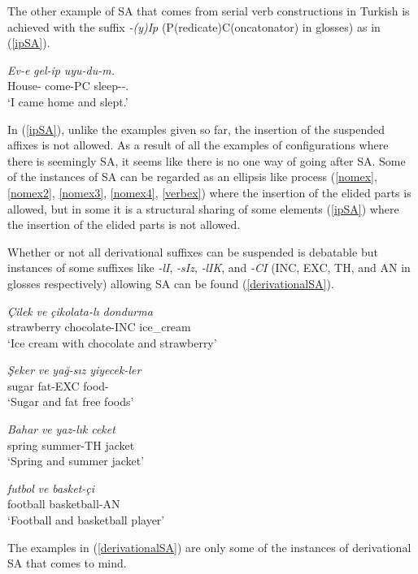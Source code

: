 The other example of SA that comes from serial verb constructions in Turkish is achieved with the suffix \textit{-(y)Ip} (P(redicate)C(oncatonator) in glosses) as in (\ref{ipSA}).

\begin{exe}
    \ex \label{ipSA}
    \gll 
    \textit{Ev-e} \textit{gel-ip} \textit{uyu-du-m.} \\ House-{\Dat} come-PC sleep-{{\Pst}}-{\First}.{\Sg} \\
    \glt `I came home and slept.'
\end{exe}

In (\ref{ipSA}), unlike the examples given so far, the insertion of the suspended affixes is not allowed. As a result of all the examples of configurations where there is seemingly SA, it seems like there is no one way of going after SA. Some of the instances of SA can be regarded as an ellipsis like process (\ref{nomex}, \ref{nomex2}, \ref{nomex3}, \ref{nomex4}, \ref{verbex}) where the insertion of the elided parts is allowed, but in some it is a structural sharing of some elements (\ref{ipSA}) where the insertion of the elided parts is not allowed.

Whether or not all derivational suffixes can be suspended is debatable but instances of some suffixes like \textit{-lI}, \textit{-sIz}, \textit{-lIK}, and \textit{-CI} (INC, EXC, TH, and AN in glosses respectively) allowing SA can be found (\ref{derivationalSA}).

\begin{exe}
    \ex \label{derivationalSA}
    \begin{xlist}

        \ex
        \gll 
        \textit{Çilek} \textit{ve} \textit{çikolata-lı} \textit{dondurma} \\ strawberry {\And} chocolate-INC ice\_cream \\
        \glt `Ice cream with chocolate and strawberry'
        
        \ex
        \gll
        \textit{Şeker} \textit{ve} \textit{yağ-sız} \textit{yiyecek-ler} \\ sugar {\And} fat-EXC food-{\Pl} \\
        \glt `Sugar and fat free foods'
        
        \ex 
        \gll
        \textit{Bahar} \textit{ve} \textit{yaz-lık} \textit{ceket} \\ spring {\And} summer-TH jacket \\
        \glt `Spring and summer jacket'
        
        \ex 
        \gll 
        \textit{futbol} \textit{ve} \textit{basket-çi} \\ football {\And} basketball-AN \\ 
        \glt `Football and basketball player'
    \end{xlist}
\end{exe}

The examples in (\ref{derivationalSA}) are only some of the instances of derivational SA that comes to mind. 
